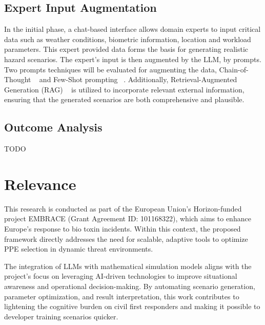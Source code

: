 \documentclass[stu]{apa7}
\begin{document}
\subsection{Expert Input Augmentation}\label{subsec:expert-input-augmentation}
In the initial phase, a chat-based interface allows domain experts to input critical
data such as weather conditions, biometric information, location and workload
parameters.
This expert provided data forms the basis for generating realistic hazard scenarios.
The expert's input is then augmented by the LLM, by prompts.
Two prompts techniques will be evaluated for augmenting the data, Chain-of-Thought ~\cite{wei2023chainofthoughtpromptingelicitsreasoning}
and Few-Shot prompting ~\cite{brown2020languagemodelsfewshotlearners}.
Additionally, Retrieval-Augmented Generation (RAG) ~\cite{lewis2021retrievalaugmentedgenerationknowledgeintensivenlp}
is utilized to incorporate relevant external information, ensuring that the generated
scenarios are both comprehensive and plausible.

\subsection{Outcome Analysis}\label{subsec:outcome-analysis}
TODO

\section{Relevance}\label{sec:relevance}

This research is conducted as part of the European Union's Horizon-funded project
EMBRACE (Grant Agreement ID: 101168322), which aims to enhance Europe's response to
bio toxin incidents.
Within this context, the proposed framework directly addresses the need for scalable,
adaptive tools to optimize PPE selection in dynamic threat environments.

The integration of LLMs with mathematical simulation models aligns with the project's
focus on leveraging AI-driven technologies to improve situational awareness and
operational decision-making.
By automating scenario generation, parameter optimization, and result interpretation,
this work contributes to lightening the cognitive burden on civil first responders and
making it possible to developer training scenarios quicker.


\end{document}
